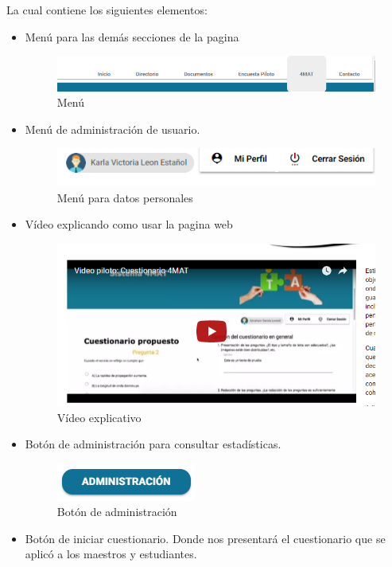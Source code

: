 La cual contiene los siguientes elementos:
	\begin{itemize}
		\item Menú para las demás secciones de la pagina
			\begin{figure}[hbtp]
		
			\includegraphics[scale=0.6]{images/Interfaz/IUGS01_menu.png}
			\caption{Menú}
		\end{figure}
		\item Menú de administración de usuario.
			\begin{figure}[hbtp]
		
			\includegraphics[scale=0.6]{images/Interfaz/IUGS01_menuadmin.png}
			\caption{Menú para datos personales}
		\end{figure}
		
		\item Vídeo explicando como usar la pagina web
		 \begin{figure}[hbtp]
		
			\includegraphics[scale=0.6]{images/Interfaz/IUGS01_video.png}
			\caption{Vídeo explicativo}
		\end{figure}
		\item Botón de administración para consultar estadísticas.
			 \begin{figure}[hbtp]
		
			\includegraphics[scale=0.6]{images/Interfaz/IUGS01_botonadmin.png}
			\caption{Botón de administración}
		\end{figure}
		\item Botón de iniciar cuestionario. Donde nos presentará el
		cuestionario que se aplicó a los maestros y estudiantes.
		\begin{figure}[hbtp]
		

\end{figure}
\end{itemize}
